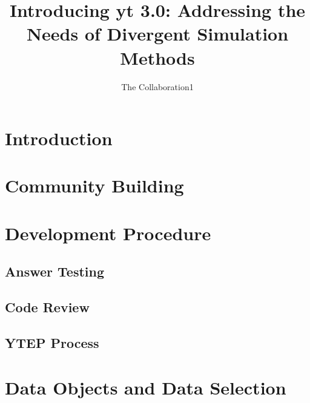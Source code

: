 \documentclass{emulateapj}
\begin{document}
\title{Introducing yt 3.0: Addressing the Needs of Divergent Simulation
Methods}
\author{The \yt{} Collaboration{1}}
\email{}

\begin{abstract}
\end{abstract}

\keywords{}


\maketitle


\section{Introduction}


\section{Community Building}


\section{Development Procedure}


\subsection{Answer Testing}


\subsection{Code Review}


\subsection{YTEP Process}


\section{Data Objects and Data Selection}

\end{document}
